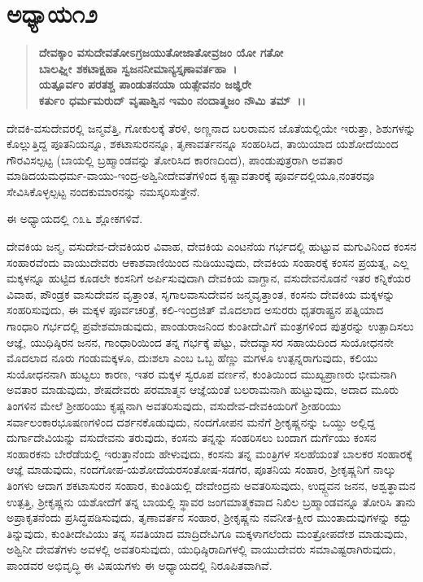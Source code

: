 \vskip 1cm

\section*{ಅಧ್ಯಾಯ\enginline{-}೧೨}

\begin{verse}
\textbf{ದೇವಕ್ಕಾಂ ವಸುದೇವತೋಽಗ್ರಜಯುತೋಜಾತೋವ್ರಜಂ ಯೋ ಗತೋ}\\\textbf{ಬಾಲಘ್ನೀ ಶಕಟಾಕ್ಷಹಾ ಸ್ವಜನನೀಮಾನ್ಯಸ್ತೃಣಾವರ್ತಹಾ~।}\\\textbf{ಯತ್ಪೂರ್ವಂ ಪರತಶ್ಚ ಪಾಂಡುತನಯಾ ಯತ್ಸೇವನಂ ಜಜ್ಞಿರೇ}\\\textbf{ಕರ್ತುಂ ಧರ್ಮಮರುದ್ ವೃಷಾಶ್ವಿನ ಇಮಂ ನಂದಾತ್ಮಜಂ ನೌಮಿ ತಮ್~।।}
\end{verse}

ದೇವಕಿ-ವಸುದೇವರಲ್ಲಿ ಜನ್ಮವೆತ್ತಿ, ಗೋಕುಲಕ್ಕೆ ತೆರಳಿ, ಅಣ್ಣನಾದ ಬಲರಾಮನ ಜೊತೆಯಲ್ಲಿಯೇ ಇರುತ್ತಾ, ಶಿಶುಗಳನ್ನು ಕೊಲ್ಲುತ್ತಿದ್ದ ಪೂತನಿಯನ್ನೂ, ಶಕಟಾಸುರನನ್ನೂ, ತೃಣಾವರ್ತನನ್ನೂ ಸಂಹರಿಸಿದ, ತಾಯಿಯಾದ ಯಶೋದೆಯಿಂದ ಗೌರವಿಸಲ್ಪಟ್ಟ (ಬಾಯಲ್ಲಿ ಬ್ರಹ್ಮಾಂಡವನ್ನು ತೋರಿಸಿದ ಕಾರಣದಿಂದ), ಪಾಂಡುಪುತ್ರರಾಗಿ ಅವತಾರ ಮಾಡಿದ\break ಯಮಧರ್ಮ-ವಾಯು-ಇಂದ್ರ-ಅಶ್ವಿನೀದೇವತೆಗಳಿಂದ ಕೃಷ್ಣಾವತಾರಕ್ಕೆ ಪೂರ್ವದಲ್ಲಿಯೂ,\break ನಂತರವೂ ಸೇವಿಸಿಕೊಳ್ಳಲ್ಪಟ್ಟ ನಂದಕುಮಾರನನ್ನು ನಮಸ್ಕರಿಸುತ್ತೇನೆ.

ಈ ಅಧ್ಯಾಯದಲ್ಲಿ ೧೩೬ ಶ್ಲೋಕಗಳಿವೆ.

ದೇವಕಿಯ ಜನ್ಮ, ವಸುದೇವ-ದೇವಕಿಯರ ವಿವಾಹ, ದೇವಕಿಯ ಎಂಟನೆಯ ಗರ್ಭದಲ್ಲಿ ಹುಟ್ಟುವ ಮಗುವಿನಿಂದ ಕಂಸನ ಸಂಹಾರವೆಂದು ವಾಯುದೇವರು ಆಕಾಶವಾಣಿಯಿಂದ ನುಡಿಯುವುದು, ದೇವಕಿಯ ಸಂಹಾರಕ್ಕೆ ಕಂಸನ ಪ್ರಯತ್ನ, ಎಲ್ಲ ಮಕ್ಕಳನ್ನೂ ಹುಟ್ಟಿದ ಕೂಡಲೇ ಕಂಸನಿಗೆ ಅರ್ಪಿಸುವುದಾಗಿ ದೇವಕಿಯ ವಾಗ್ದಾನ, ವಸುದೇವನೊಡನೆ ಇತರ ಕನ್ನಿಕೆಯರ ವಿವಾಹ, ಪೌಂಡ್ರಕ ವಾಸುದೇವನ ವೃತ್ತಾಂತ, ಸೃಗಾಲವಾಸುದೇವನ ಜನ್ಮವೃತ್ತಾಂತ, ಕಂಸನು ದೇವಕಿಯ ಮಕ್ಕಳನ್ನು ಸಂಹರಿಸುವುದು, ಈ ಮಕ್ಕಳ ಪೂರ್ವಚರಿತ್ರೆ, ಕಲಿ-\-ಇಂದ್ರಜಿತ್ ಮೊದಲಾದ ಅಸುರರು ಧೃತರಾಷ್ಟ್ರನ ಪತ್ನಿಯಾದ ಗಾಂಧಾರಿ ಗರ್ಭದಲ್ಲಿ ಪ್ರವೇಶಮಾಡುವುದು, ಪಾಂಡುರಾಜನಿಂದ ಕುಂತೀದೇವಿಗೆ ಮಂತ್ರಗಳಿಂದ ಪುತ್ರರನ್ನು ಉತ್ಪಾದಿಸಲು ಆಜ್ಞೆ, ಯುಧಿಷ್ಠಿರನ ಜನನ, ಗಾಂಧಾರಿಯಿಂದ ತನ್ನ ಗರ್ಭಕ್ಕೆ ಪೆಟ್ಟು, ವೇದವ್ಯಾಸರ ಸಹಾಯದಿಂದ ಸುಯೋಧನನೇ ಮೊದಲಾದ ನೂರು ಗಂಡುಮಕ್ಕಳೂ, ದುಃಶಲಾ ಎಂಬ ಒಬ್ಬ ಹೆಣ್ಣು ಮಗಳೂ ಉತ್ಪನ್ನರಾಗುವುದು, ಕಲಿಯು ಸುಯೋಧನನಾಗಿ ಹುಟ್ಟಲು ಕಾರಣ, ಇತರ ಮಕ್ಕಳ ಸ್ವರೂಪ ವರ್ಣನೆ, ಕುಂತಿಯಿಂದ ಮುಖ್ಯಪ್ರಾಣರು ಭೀಮನಾಗಿ ಅವತಾರ ಮಾಡುವುದು, ಶೇಷದೇವರು ಪರಮಾತ್ಮನ ಆಜ್ಞೆಯಂತೆ ಬಲರಾಮನಾಗಿ ಹುಟ್ಟುವುದು, ಅದಾದ ಮೂರು ತಿಂಗಳಿನ ಮೇಲೆ ಶ‍್ರೀಹರಿಯು ಕೃಷ್ಣನಾಗಿ ಅವತರಿಸುವುದು, ವಸುದೇವ-ದೇವಕಿ\-ಯರಿಗೆ ಶ‍್ರೀಹರಿಯು ಸರ್ವಾಲಂಕಾರಭೂಷಣಗಳಿಂದ ದರ್ಶನಕೊಡುವುದು, ನಂದಗೋಪನ ಮನೆಗೆ ಶ‍್ರೀಕೃಷ್ಣನನ್ನು ಒಯ್ದು ಅಲ್ಲಿದ್ದ ದುರ್ಗಾದೇವಿಯನ್ನು ವಸುದೇವನು ತರುವುದು, ಕಂಸನು ತನ್ನನ್ನು ಸಂಹರಿಸಲು ಬಂದಾಗ ದುರ್ಗೆಯು ಕಂಸನ ಸಂಹಾರಕನು ಬೇರೆಡೆಯಲ್ಲಿ ಇರುತ್ತಾನೆಂದು ಹೇಳುವುದು, ಕಂಸನು ತನ್ನ ಮಂತ್ರಿಗಳ ಸಲಹೆಯಂತೆ ಬಾಲಕರ ಸಂಹಾರಕ್ಕೆ ಆಜ್ಞೆ ಮಾಡುವುದು, ನಂದಗೋಪ-ಯಶೋದೆಯರ\break ಸಂತೋಷ-ಸಡಗರ, ಪೂತನಿಯ ಸಂಹಾರ, ಶ‍್ರೀಕೃಷ್ಣನಿಗೆ ನಾಲ್ಕು ತಿಂಗಳು ಆದಾಗ ಶಕಟಾಸುರನ ಸಂಹಾರ, ಕುಂತಿಯಲ್ಲಿ ದೇವೇಂದ್ರನು ಅವತರಿಸುವುದು, ಉದ್ದ್ಬವನ ಜನನ, ಅಶ್ವತ್ಥಾಮನ ಉತ್ಪತ್ತಿ, ಶ‍್ರೀಕೃಷ್ಣನು ಯಶೋದೆಗೆ ತನ್ನ ಬಾಯಲ್ಲಿ ಸ್ಥಾವರ ಜಂಗಮಾತ್ಮಕವಾದ ನಿಖಿಲ ಬ್ರಹ್ಮಾಂಡವನ್ನೂ ತೋರಿಸಿ ತಾನು ಅಪ್ರಾಕೃತನೆಂದು ಪ್ರಸಿದ್ಧಪಡಿಸುವುದು, ತೃಣಾವರ್ತನ ಸಂಹಾರ, ಶ‍್ರೀಕೃಷ್ಣನು ನವನೀತ-ಕ್ಷೀರ ಮುಂತಾದುವುಗಳನ್ನು ಕದ್ದು ತಿನ್ನುವುದು, ಕುಂತೀದೇವಿಯು ತನ್ನ ಸವತಿಯಾದ ಮಾದ್ರಿದೇವಿಗೂ ಮಕ್ಕಳಾಗಲೆಂದು ಮಂತ್ರೋಪದೇಶ ಮಾಡುವುದು, ಅಶ್ವಿನೀ ದೇವತೆಗಳು ಅವಳಲ್ಲಿ ಅವತರಿಸುವುದು, ಯುಧಿಷ್ಠಿರಾದಿಗಳಲ್ಲಿ ವಾಯುದೇವರು ಸಮಾವಿಷ್ಟರಾಗಿರುವುದು, ಪಾಂಡವರ ಅಭಿವೃದ್ಧಿ ಈ ವಿಷಯಗಳು ಈ ಅಧ್ಯಾಯದಲ್ಲಿ ನಿರೂಪಿತವಾಗಿವೆ.


